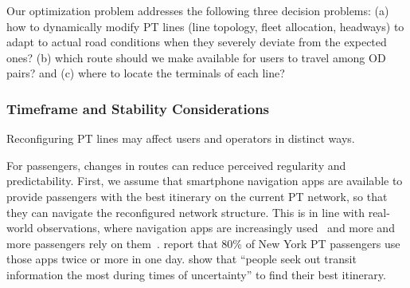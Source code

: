 \documentclass[a4paper,fleqn]{cas-sc}
\begin{document}
Our optimization problem addresses the following three decision problems:
(a) how to dynamically modify PT lines (line topology, fleet allocation, headways) to adapt to actual road conditions when they severely deviate from the expected ones?
(b) which route should we make available for users to travel among OD pairs? and
(c) where to locate the terminals of each line?


\subsubsection{Timeframe and Stability Considerations}\label{sec:timeframe}
Reconfiguring PT lines may affect users and operators in distinct ways. 

For passengers, changes in routes can reduce perceived regularity and predictability. First, we assume that smartphone navigation apps are available to provide passengers with the best itinerary on the current PT network, so that they can navigate the reconfigured network structure. This is in line with real-world observations, where navigation apps are increasingly used~\citep {SmartphoneUse2016} and more and more passengers rely on them~\citep{durand2024digital}. \citet[p 147]{ghahramani2016trends} report that 80\% of New York PT passengers use those apps twice or more in one day. \citet{Shalaby2024} show that ``people seek out transit information the most during times of uncertainty'' to find their best itinerary.
%
\end{document}
